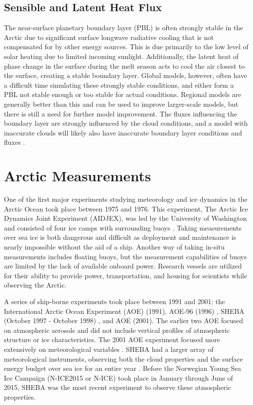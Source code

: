 \subsection{Sensible and Latent Heat Flux}
The near-surface planetary boundary layer (PBL) is often strongly stable in the Arctic due to significant surface longwave radiative cooling that is not compensated for by other energy sources. This is due primarily to the low level of solar heating due to limited incoming sunlight. Additionally, the latent heat of phase change in the surface during the melt season acts to cool the air closest to the surface, creating a stable boundary layer. Global models, however, often have a difficult time simulating these strongly stable conditions, and either form a PBL not stable enough or too stable for actual conditions. Regional models are generally better than this and can be used to improve larger-scale models, but there is still a need for further model improvement. The fluxes influencing the boundary layer are strongly influenced by the cloud conditions, and a model with inaccurate clouds will likely also have inaccurate boundary layer conditions and fluxes \citep{tjernstrom:2005}. 

\section{Arctic Measurements}
One of the first major experiments studying meteorology and ice dynamics in the Arctic Ocean took place between 1975 and 1976. This experiment, The Arctic Ice Dynamics Joint Experiment (AIDJEX), was led by the University of Washington and consisted of four ice camps with surrounding buoys \citep{untersteiner:1980}. Taking measurements over sea ice is both dangerous and difficult as deployment and maintenance is nearly impossible without the aid of a ship. Another way of taking in-situ measurements includes floating buoys, but the measurement capabilities of buoys are limited by the lack of available onboard power. Research vessels are utilized for their ability to provide power, transportation, and housing for scientists while observing the Arctic.

A series of ship-borne experiments took place between 1991 and 2001: the International Arctic Ocean Experiment (AOE) (1991), AOE-96 (1996) \citep{tjernstrom:2004}, SHEBA (October 1997 - October 1998) \citep{uttal:2002}, and AOE (2001). The earlier two AOE focused on atmospheric aerosols and did not include vertical profiles of atmospheric structure or ice characteristics. The 2001 AOE experiment focused more extensively on meteorological variables \citep{tjernstrom:2004}. SHEBA had a larger array of meteorological instruments, observing both the cloud properties and the surface energy budget over sea ice for an entire year \citep{uttal:2002}. Before the Norwegian Young Sea Ice Campaign (N-ICE2015 or N-ICE) took place in January through June of 2015, SHEBA was the most recent experiment to observe these atmospheric properties. 

